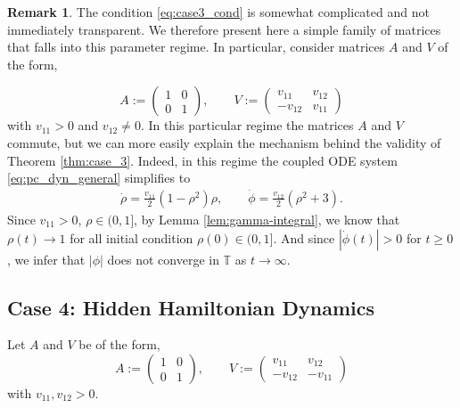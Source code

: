 \documentclass[10pt]{article}
\theoremstyle{definition}
\theoremstyle{definition}
\newtheorem{remark}[theorem]{Remark}
\numberwithin{equation}{section}
\newcommand{\BBT}{\mathbb{T}}
\newcommand{\Drho}{\Dot{\rho}}
\newcommand{\Dphi}{\Dot{\phi}}
\begin{document}
\begin{remark}\label{rem:case3prime}
The condition \eqref{eq:case3_cond} is somewhat complicated and not immediately transparent.
We therefore present here a simple family of matrices that falls into this parameter regime.
In particular, consider matrices $A$ and $V$ of the form,

\begin{equation}\label{eq:matrices_A_V_case3_special}
    A := \begin{pmatrix}
        1 & 0 \\
        0 & 1
    \end{pmatrix},  \qquad V := \begin{pmatrix}
        v_{11} & v_{12} \\
        -v_{12} & v_{11}
    \end{pmatrix}
\end{equation}
with $v_{11} > 0$ and $v_{12} \neq 0$. In this particular regime the matrices $A$ and $V$ commute, but we can more easily explain the mechanism behind the validity of Theorem \ref{thm:case_3}. Indeed, in this regime the coupled ODE system \eqref{eq:pc_dyn_general} simplifies to
\begin{equation}
\label{eq:pc_dyn_case_3_prime}
\begin{aligned}
\Drho = \frac{v_{11}}{2} (1 - \rho^2) \rho, \qquad \Dphi = \frac{v_{12}}{2} (\rho^2 + 3) .
\end{aligned}
\end{equation}
Since $v_{11} > 0$, $\rho \in (0,1]$, by Lemma \ref{lem:gamma-integral}, we know that $\rho(t) \rightarrow 1$ for all initial condition $\rho(0) \in (0,1]$. 
And since $|\Dphi(t)| > 0$ for $t \geq 0$, we infer that $|\phi|$ does not converge in $\BBT$ as $t \rightarrow \infty$. 
\end{remark}

\subsection{Case 4: Hidden Hamiltonian Dynamics}
\label{sec:th_case4}

Let $A$ and $V$ be of the form,
\begin{equation}\label{eq:matrices_A_V_case_4}
    A := \begin{pmatrix}
        1 & 0 \\
        0 & 1
    \end{pmatrix},  \qquad V := \begin{pmatrix}
        v_{11} & v_{12} \\
        -v_{12} & -v_{11}
    \end{pmatrix}
\end{equation}
with $v_{11}, v_{12} > 0$.  
\end{document}
